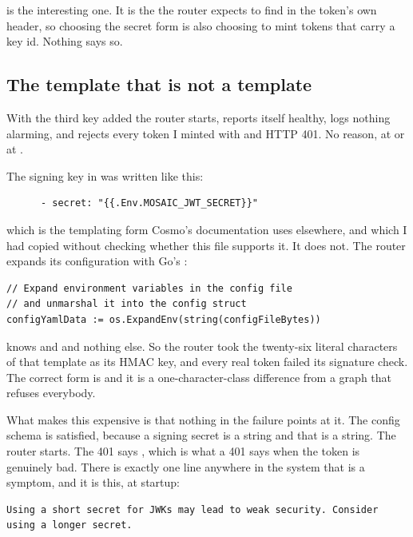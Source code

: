  is the interesting one. It is the  the router
expects to find in the token's own header, so choosing the secret form is also
choosing to mint tokens that carry a key id. Nothing says so.

\subsection*{The template that is not a template}

%
With the third key added the router starts, reports itself healthy, logs
nothing alarming, and rejects every token I minted with  and
HTTP 401. No reason, at  or at .

The signing key in  was written like this:

\begin{verbatim}
      - secret: "{{.Env.MOSAIC_JWT_SECRET}}"
\end{verbatim}

which is the templating form Cosmo's documentation uses elsewhere, and which I
had copied without checking whether this file supports it. It does not. The
router expands its configuration with Go's :

\begin{verbatim}
// Expand environment variables in the config file
// and unmarshal it into the config struct
configYamlData := os.ExpandEnv(string(configFileBytes))
\end{verbatim}

 knows  and  and nothing else.
So the router took the twenty-six literal characters of that template as its
HMAC key, and every real token failed its signature check. The correct form is
 and it is a one-character-class difference
from a graph that refuses everybody.

What makes this expensive is that nothing in the failure points at it. The
config schema is satisfied, because a signing secret is a string and that is a
string. The router starts. The 401 says , which is what a
401 says when the token is genuinely bad. There is exactly one line anywhere in
the system that is a symptom, and it is this, at startup:

\begin{verbatim}
Using a short secret for JWKs may lead to weak security. Consider using a longer secret.
\end{verbatim}

